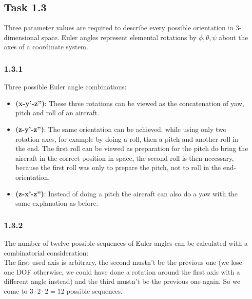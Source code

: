 \subsection*{Task 1.3}
Three parameter values are required to describe every possible orientation in 3-dimensional space.
Euler angles represent elemental rotations by $\phi,\theta,\psi$ about the axes of a coordinate system.
\subsubsection*{1.3.1}
Three possible Euler angle combinations:
\begin{itemize}
	\item \textbf{(x-y'-z'')}: These three rotations can be viewed as the concatenation of yaw, pitch and roll of an aircraft.
	\item \textbf{(z-y'-z'')}: The same orientation can be achieved, while using only two rotation axes, for example by doing a roll, then a pitch and another roll in the end. The first roll can be viewed as preparation for the pitch do bring the aircraft in the correct position in space, the second roll is then necessary, because the first roll was only to prepare the pitch, not to roll in the end-orientation.
	\item \textbf{(z-x'-z'')}: Instead of doing a pitch the aircraft can also do a yaw with the same explanation as before.
\end{itemize}

\subsubsection*{1.3.2}
The number of twelve possible sequences of Euler-angles can be calculated with a combinatorial consideration:\\
The first used axis is arbitrary, the second mustn't be the previous one (we lose one DOF otherwise, we could have done a rotation around the first axis with a different angle instead) and the third mustn't be the previous one again. So we come to $3\cdot 2\cdot 2 = 12$ possible sequences.
